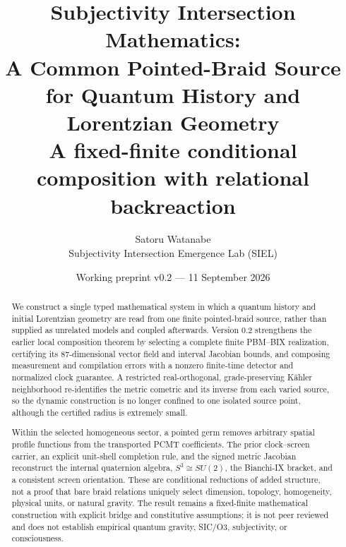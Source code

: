 \documentclass[11pt]{article}
\title{\vspace{-1.2cm}\textbf{Subjectivity Intersection Mathematics:}\\[0.18em]\textbf{A Common Pointed-Braid Source for Quantum History and Lorentzian Geometry}\\[0.35em]\Large A fixed-finite conditional composition with relational backreaction}
\author{Satoru Watanabe\\\small Subjectivity Intersection Emergence Lab (SIEL)}
\date{Working preprint v0.2 --- 11 September 2026}
\theoremstyle{definition}
\theoremstyle{remark}
\begin{document}
\maketitle

\begin{center}
\end{center}

\begin{abstract}
We construct a single typed mathematical system in which a quantum history and initial Lorentzian geometry are read from one finite pointed-braid source, rather than supplied as unrelated models and coupled afterwards. Version 0.2 strengthens the earlier local composition theorem by selecting a complete finite PBM--BIX realization, certifying its 87-dimensional vector field and interval Jacobian bounds, and composing measurement and compilation errors with a nonzero finite-time detector and normalized clock guarantee. A restricted real-orthogonal, grade-preserving K\"ahler neighborhood re-identifies the metric cometric and its inverse from each varied source, so the dynamic construction is no longer confined to one isolated source point, although the certified radius is extremely small.

Within the selected homogeneous sector, a pointed germ removes arbitrary spatial profile functions from the transported PCMT coefficients. The prior clock--screen carrier, an explicit unit-shell completion rule, and the signed metric Jacobian reconstruct the internal quaternion algebra, $S^3\cong SU(2)$, the Bianchi-IX bracket, and a consistent screen orientation. These are conditional reductions of added structure, not a proof that bare braid relations uniquely select dimension, topology, homogeneity, physical units, or natural gravity. The result remains a fixed-finite mathematical construction with explicit bridge and constitutive assumptions; it is not peer reviewed and does not establish empirical quantum gravity, SIC/O3, subjectivity, or consciousness.
\end{abstract}
\end{document}
